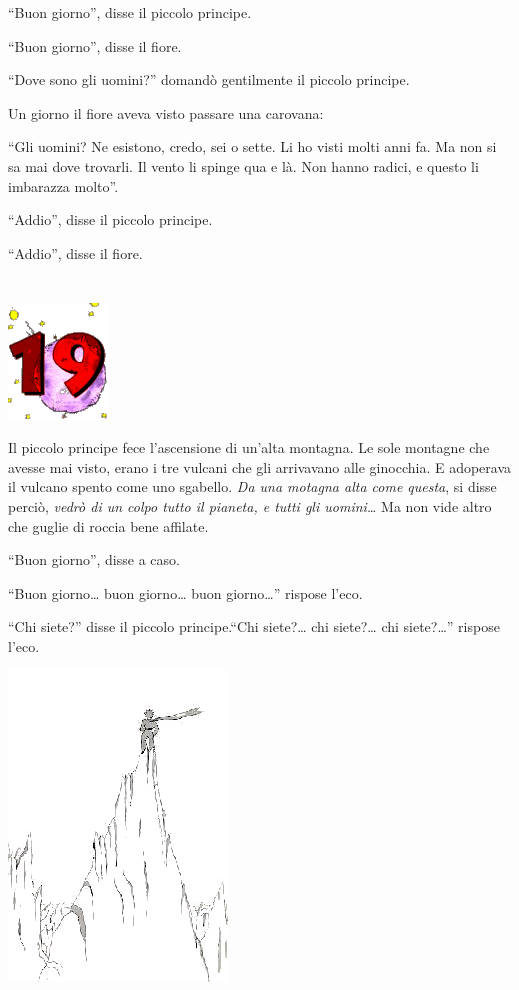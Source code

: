 \documentclass[11pt]{scrbook}
\begin{document}
``Buon giorno'', disse il piccolo principe.

``Buon giorno'', disse il fiore.

``Dove sono gli uomini?'' domandò gentilmente il piccolo principe.

Un giorno il fiore aveva visto passare una carovana:

``Gli uomini? Ne esistono, credo, sei o sette. Li ho visti molti anni fa. Ma non si sa mai dove trovarli. Il vento li spinge qua e là. Non hanno radici, e questo li imbarazza molto''.

``Addio'', disse il piccolo principe.

``Addio'', disse il fiore.

\chapter{}
\begin{center}
\includegraphics{img/chapter19}
\end{center}

Il piccolo principe fece l'ascensione di un'alta montagna. Le sole montagne che avesse mai visto, erano i tre vulcani che gli arrivavano alle ginocchia. E adoperava il vulcano spento come uno sgabello. \emph{Da una motagna alta come questa}, si disse perciò, \emph{vedrò di un colpo tutto il pianeta, e tutti gli uomini\ldots{}} Ma non vide altro che guglie di roccia bene affilate.

``Buon giorno'', disse a caso.

``Buon giorno\ldots{} buon giorno\ldots{} buon giorno\ldots{}'' rispose l'eco.

``Chi siete?'' disse il piccolo principe.``Chi siete?\ldots{} chi siete?\ldots{} chi siete?\ldots{}'' rispose l'eco.

\begin{center}
\includegraphics{img/19a}
\end{center}
\end{document}
